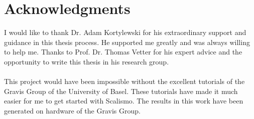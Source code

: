 \chapter{Acknowledgments}
I would like to thank Dr. Adam Kortylewski for his extraordinary support and guidance in this thesis process. He supported me greatly and was always willing to help me. Thanks to Prof. Dr. Thomas Vetter for his expert advice and the opportunity to write this thesis in his research group.\\
\\%
This project would have been impossible without the excellent tutorials of the Gravis Group of the University of Basel. These tutorials have made it much easier for me to get started with Scalismo. The results in this work have been generated on hardware of the Gravis Group.

